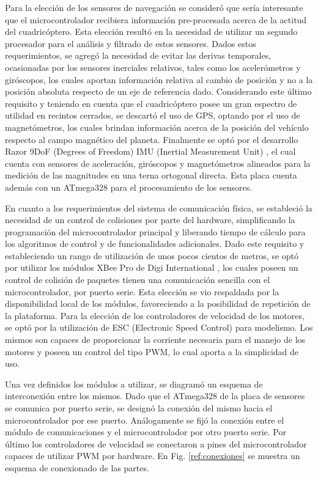\documentclass[a4paper, conference]{IEEEtran}
\begin{document}
Para la elección de los sensores de navegación se consideró que sería interesante que el microcontrolador recibiera información pre-procesada acerca de la actitud del cuadricóptero. Esta elección resultó en la necesidad de utilizar un segundo procesador para el análisis y filtrado de estos sensores. Dados estos requerimientos, se agregó la necesidad de evitar las derivas temporales, ocasionadas por los sensores inerciales relativos, tales como los acelerómetros y giróscopos, los cuales aportan información relativa al cambio de posición y no a la posición absoluta respecto de un eje de referencia dado. Considerando este último requisito y teniendo en cuenta que el cuadricóptero posee un gran espectro de utilidad en recintos cerrados, se descartó el uso de GPS, optando por el uso de magnetómetros, los cuales brindan información acerca de la posición del vehículo respecto al campo magnético del planeta. Finalmente se optó por el desarrollo Razor 9DoF (Degrees of Freedom) IMU (Inertial Measurement Unit) \cite{razor9d0f}, el cual cuenta con sensores de aceleración, giróscopos y magnetómetros alineados para la medición de las magnitudes en una terna ortogonal directa. Esta placa cuenta además con un ATmega328 para el procesamiento de los sensores.

En cuanto a los requerimientos del sistema de comunicación física, se estableció la necesidad de un control de colisiones por parte del hardware, simplificando la programación del microcontrolador principal y liberando tiempo de cálculo para los algoritmos de control y de funcionalidades adicionales. Dado este requisito y estableciendo un rango de utilización de unos pocos cientos de metros, se optó por utilizar los módulos XBee Pro de Digi International \cite{xbee}, los cuales poseen un control de colisión de paquetes tienen una comunicación sencilla con el microcontrolador, por puerto serie. Esta elección se vio respaldada por la disponibilidad local de los módulos, favoreciendo a la posibilidad de repetición de la plataforma.
Para la elección de los controladores de velocidad de los motores, se optó por la utilización de ESC (Electronic Speed Control) para modelismo. Los mismos son capaces de proporcionar la corriente necesaria para el manejo de los motores y poseen un control del tipo PWM, lo cual aporta a la simplicidad de uso.

Una vez definidos los módulos a utilizar, se diagramó un esquema de interconexión entre los mismos. Dado que el ATmega328 de la placa de sensores se comunica por puerto serie, se designó la conexión del mismo hacia el microcontrolador por ese puerto. Análogamente se fijó la conexión entre el módulo de comunicaciones y el microcontrolador por otro puerto serie. Por último los controladores de velocidad se conectaron a pines del microcontrolador capaces de utilizar PWM por hardware. En Fig. \ref{ref:conexiones} se muestra un esquema de conexionado de las partes.
\end{document}
